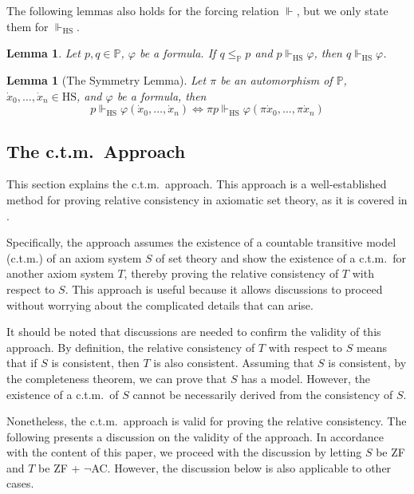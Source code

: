 \documentclass{report}
\newtheorem{lem}[thm]{Lemma}
\begin{document}
The following lemmas also holds for the forcing relation $\Vdash$, but we only state them for $\Vdash_{\mathrm{HS}}$.

\begin{lem}\label{lem:strengthening}
  Let $p, q \in \mathbb{P}$, $\varphi$ be a formula. If $q \leq_{\mathbb{P}} p$ and $p \Vdash_{\mathrm{HS}} \varphi$, then $q \Vdash_{\mathrm{HS}} \varphi$.
\end{lem}

\begin{lem}[The Symmetry Lemma]\label{lem:symmetry_lemma}
  Let $\pi$ be an automorphism of $\mathbb{P}$, $\dot{x}_0, \ldots, \dot{x}_n \in \mathrm{HS}$, and $\varphi$ be a formula, then
  $$p \Vdash_{\mathrm{HS}} \varphi(\dot{x}_0, \ldots, \dot{x}_n) \Leftrightarrow \pi p \Vdash_{\mathrm{HS}} \varphi(\pi \dot{x}_0, \ldots, \pi \dot{x}_n)$$
\end{lem}


\subsection{The c.t.m.\  Approach}\label{subsection:ctm}
This section explains the c.t.m.\ approach.
This approach is a well-established method for proving relative consistency in axiomatic set theory,
as it is covered in \cite{kunen2011}.

Specifically, the approach assumes the existence of a countable transitive model (c.t.m.) 
of an axiom system $S$ of set theory and show the existence of a c.t.m.\ for another axiom system $T$, 
thereby proving the relative consistency of $T$ with respect to $S$.
This approach is useful because it allows discussions to proceed without worrying about the complicated details that can arise.

It should be noted that discussions are needed to confirm the validity of this approach.
By definition, the relative consistency of $T$ with respect to $S$ means that if $S$ is consistent, then $T$ is also consistent.
Assuming that $S$ is consistent, by the completeness theorem, we can prove that $S$ has a model.
However, the existence of a c.t.m.\  of $S$ cannot be necessarily derived from the consistency of $S$.

Nonetheless, the c.t.m.\  approach is valid for proving the relative consistency.
The following presents a discussion on the validity of the approach.
In accordance with the content of this paper, we proceed with the discussion by letting $S$ be ZF and $T$ be ZF + $\neg$AC.
However, the discussion below is also applicable to other cases.
\end{document}
